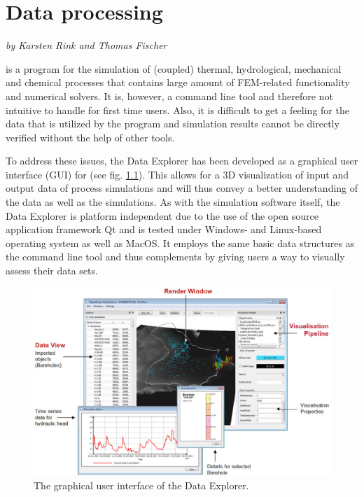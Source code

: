 

\chapter{Data processing}
\textit{by Karsten Rink and Thomas Fischer}

\bigskip

\ogs is a program for the simulation of (coupled) thermal, hydrological, mechanical and chemical processes that contains large amount of FEM-related functionality and numerical solvers. It is, however, a command line tool and therefore not intuitive to handle for first time users. Also, it is difficult to get a feeling for the data that is utilized by the program and simulation results cannot be directly verified without the help of other tools.

To address these issues, the \ogs Data Explorer has been developed as a graphical user interface (GUI) for \ogs (see fig. \ref{fig:kr:gui}). This allows for a 3D visualization of input and output data of process simulations and will thus convey a better understanding of the data as well as the simulations. As with the simulation software itself, the Data Explorer is platform independent due to the use of the open source application framework Qt and is tested under Windows- and Linux-based operating system as well as MacOS. It employs the same basic data structures as the command line tool and thus complements \ogs by giving users a way to visually assess their data sets.

\begin{figure}[tb]
\begin{center}
\includegraphics[width=0.99\linewidth]{figures/gui}
\caption{The graphical user interface of the \ogs Data Explorer.}
\label{fig:kr:gui}
\end{center}
\end{figure}

